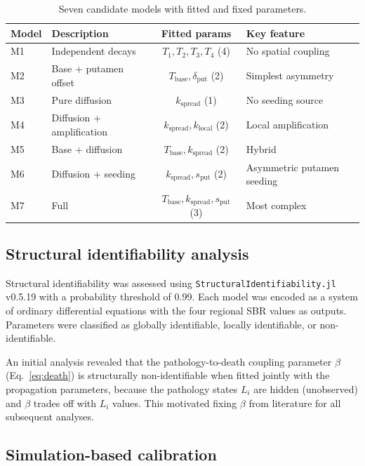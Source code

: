 \begin{table}[H]
\centering
\caption{Seven candidate models with fitted and fixed parameters.}
\label{tab:models}
\begin{tabular}{@{}llcl@{}}
\toprule
Model & Description & Fitted params & Key feature \\
\midrule
M1 & Independent decays & $T_1, T_2, T_3, T_4$ (4) & No spatial coupling \\
M2 & Base + putamen offset & $T_{\text{base}}, \delta_{\text{put}}$ (2) & Simplest asymmetry \\
M3 & Pure diffusion & $k_{\text{spread}}$ (1) & No seeding source \\
M4 & Diffusion + amplification & $k_{\text{spread}}, k_{\text{local}}$ (2) & Local amplification \\
M5 & Base + diffusion & $T_{\text{base}}, k_{\text{spread}}$ (2) & Hybrid \\
M6 & Diffusion + seeding & $k_{\text{spread}}, s_{\text{put}}$ (2) & Asymmetric putamen seeding \\
M7 & Full & $T_{\text{base}}, k_{\text{spread}}, s_{\text{put}}$ (3) & Most complex \\
\bottomrule
\end{tabular}
\end{table}

\subsection{Structural identifiability analysis}

Structural identifiability was assessed using \texttt{StructuralIdentifiability.jl} v0.5.19 \cite{dong2023} with a probability threshold of 0.99. Each model was encoded as a system of ordinary differential equations with the four regional SBR values as outputs. Parameters were classified as globally identifiable, locally identifiable, or non-identifiable.

An initial analysis revealed that the pathology-to-death coupling parameter $\beta$ (Eq.~\ref{eq:death}) is structurally non-identifiable when fitted jointly with the propagation parameters, because the pathology states $L_i$ are hidden (unobserved) and $\beta$ trades off with $L_i$ values. This motivated fixing $\beta$ from literature for all subsequent analyses.

\subsection{Simulation-based calibration}

